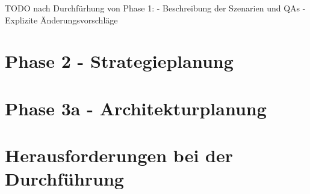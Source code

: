 TODO nach Durchfürhung von Phase 1:
 - Beschreibung der Szenarien und QAs
 - Explizite Änderungsvorschläge


\section{Phase 2 - Strategieplanung}
\label{sec:durchführung-phase2}

\section{Phase 3a - Architekturplanung}
\section{Herausforderungen bei der Durchführung}
